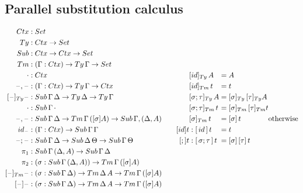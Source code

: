 \documentclass[a4paper,UKenglish,numberwithinsect,cleveref,thm-restate]{lipics-v2021}
\begin{document}
\subsection{Parallel substitution calculus} \label{subsec:SC}
\[
\begin{alignedat}{10}
  \Ctx   & : \Set                   \\
  \Ty    & : \Ctx \to \Set          \\
  \Sub   & : \Ctx \to \Ctx \to \Set \\
  \Tm    & : (\Gamma : \Ctx) \to \Ty\,\Gamma \to \Set \\
  \emptyctx & : \Ctx \\
  \blank,\blank & : (\Gamma : \Ctx) \to \Ty\,\Gamma \to \Ctx \\
  [\blank]_{\Ty}\blank &: \Sub\,\Gamma\,\Delta \to \Ty\,\Delta \to \Ty\,\Gamma \\
  \emptysub & : \Sub\,\Gamma\,\emptyctx \\
  \blank,\blank & : \Sub\,\Gamma\,\Delta \to \Tm\,\Gamma\,([ \sigma ] A) \to \Sub\,\Gamma,(\Delta, A) \\
  \idS_{\blank} & : (\Gamma : \Ctx) \to \Sub\,\Gamma\,\Gamma \\
  \blank;\blank & : \Sub\,\Gamma\,\Delta \to \Sub\,\Delta\,\Theta \to \Sub\,\Gamma\,\Theta \\
  \pi_1 & : \Sub\,\Gamma\,(\Delta, A) \to \Sub\,\Gamma\,\Delta \\
  \pi_2 & : (\sigma : \Sub\,\Gamma\,(\Delta, A)) \to \Tm\,\Gamma\,([ \sigma ] A) \\
  [\blank]_{\Tm}\blank & : (\sigma : \Sub\,\Gamma\,\Delta) \to \Tm\,\Delta\,A \to \Tm\,\Gamma\,([\sigma] A) \\
  [\blank] \blank & : (\sigma : \Sub\,\Gamma\,\Delta) \to \Tm\,\Delta\,A \to \Tm\,\Gamma\,([\sigma] A)
\end{alignedat}
\qquad
\begin{alignedat}{10}
          & [ \idS ]_{\Ty}\,A           && = A \\
          & [ \idS ]_{\Tm}\,t           && = t \\
          & [ \sigma ; \tau ]_{\Ty}\,A  && = [ \sigma ]_{\Ty}\,[ \tau ]_{\Ty} A \\
          & [ \sigma ; \tau ]_{\Tm}\,t  && = [ \sigma ]_{\Tm}\,[ \tau ]_{\Tm} t \\
          & [ \sigma ]_{\Tm}\,t         && = [ \sigma ]\,t & \text{otherwise}  \\
  [\idS]t & : [\,\idS\,]\,t             && = t \\
  [;]t    & : [\,\sigma ; \tau\,]\,t    && = [ \sigma ]\,[ \tau ]\,t \\
\end{alignedat}
\]
\end{document}
